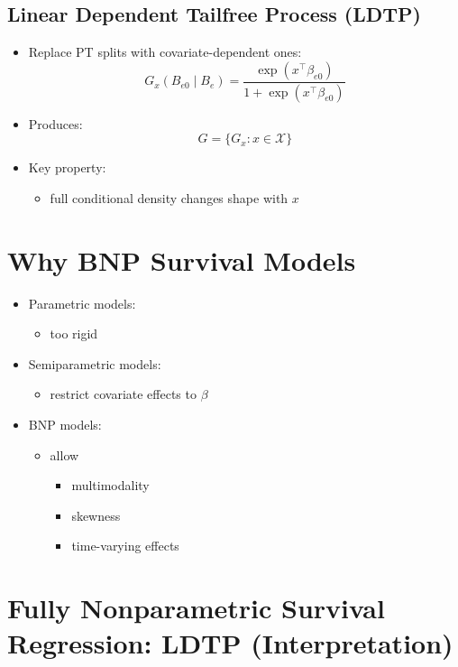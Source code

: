 \documentclass[12pt,oneside]{book}
\numberwithin{equation}{section}
\theoremstyle{definition}
\theoremstyle{plain}
\theoremstyle{remark}
\begin{document}
\subsection{Linear Dependent Tailfree Process (LDTP)}

\begin{itemize}
\item Replace PT splits with covariate-dependent ones:
\[
G_x(B_{e0} \mid B_e)
=
\frac{\exp(x^\top \beta_{e0})}{1 + \exp(x^\top \beta_{e0})}
\]

\item Produces:
\[
G = \{G_x : x \in \mathcal{X}\}
\]

\item Key property:
\begin{itemize}
\item full conditional density changes shape with $x$
\end{itemize}
\end{itemize}

\section{Why BNP Survival Models}

\begin{itemize}
\item Parametric models:
\begin{itemize}
\item too rigid
\end{itemize}

\item Semiparametric models:
\begin{itemize}
\item restrict covariate effects to $\beta$
\end{itemize}

\item BNP models:
\begin{itemize}
\item allow
\begin{itemize}
\item multimodality
\item skewness
\item time-varying effects
\end{itemize}
\end{itemize}
\end{itemize}

\section{Fully Nonparametric Survival Regression: LDTP (Interpretation)}
\end{document}
